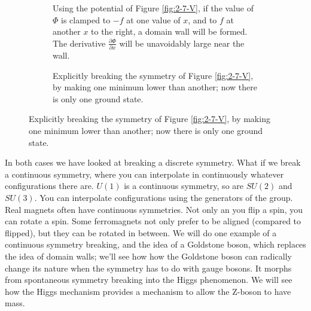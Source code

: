 \documentclass[]{article}
\begin{document}
\begin{figure}[H]
	\begin{subfigure}[t]{0.45\textwidth}
		\begin{center}
			\caption{Using the potential of Figure \ref{fig:2-7-V}, if the value of $\Phi$ is clamped to $-f$ at one value of $x$, and to $f$ at another $x$ to the right, a domain wall will be formed. The derivative $\frac{\partial \Phi}{\partial x}$ will be unavoidably large near the wall.}\label{fig:2-7-V-domain-wall}
		\end{center}
	\end{subfigure}
	\hfill
	\begin{subfigure}[t]{0.45\textwidth}
		\caption{Explicitly breaking the symmetry of Figure \ref{fig:2-7-V}, by making one minimum lower than another; now there is only one ground state.}\label{fig:2-7-V-broken}
	\end{subfigure}
\end{figure}

In both cases we have looked at breaking a discrete symmetry. What if we break a continuous symmetry, where you can interpolate in continuously whatever configurations there are. $U(1)$ is a continuous symmetry, so are $SU(2)$ and $SU(3)$. You can interpolate configurations using the generators of the group. Real magnets often have continuous symmetries. Not only an you flip a spin, you can rotate a spin. Some ferromagnets not only prefer to be aligned (compared to flipped), but they can be rotated in between. We will do one example of a continuous symmetry breaking, and the idea of a Goldstone boson, which replaces the idea of domain walls; we'll see how how the Goldstone boson can radically change its nature when the symmetry has to do with gauge bosons. It morphs from spontaneous symmetry breaking into the Higgs phenomenon. We will see how the Higgs mechanism provides a mechanism to allow the Z-boson to have mass.
\end{document}
